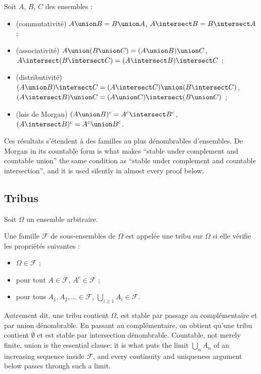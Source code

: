 \begin{notation}
  Soit $A$, $B$, $C$ des ensembles :
  \begin{itemize}
    \item (commutativité) $A \union B = B \union A$,
      $A \intersect B = B \intersect A$ ;
    \item (associativité) $A \union (B \union C) = (A \union B) \union C$,
      $A \intersect (B \intersect C) = (A \intersect B) \intersect C$ ;
    \item (distributivité) $(A \union B) \intersect C = (A \intersect C) \union
      (B \intersect C)$, $(A \intersect B) \union C = (A \union C) \intersect
      (B \union C)$ ;
    \item (lois de Morgan) $(A \union B)^{c} = A^{c} \intersect B^{c}$,
      $(A \intersect B)^{c} = A^{c} \union B^{c}$.
  \end{itemize}
  Ces résultats s'étendent à des familles au plus dénombrables d'ensembles. De
  Morgan in its countable form is what makes ``stable under complement and
  countable union'' the same condition as ``stable under complement and countable
  intersection'', and it is used silently in almost every proof below.
\end{notation}

\subsection{Tribus}

Soit $\Omega$ un ensemble arbitraire.

\begin{definition}[Tribu]
  Une famille $\mathcal{F}$ de sous-ensembles de $\Omega$ est appelée une tribu sur
  $\Omega$ si elle vérifie les propriétés suivantes :
  \begin{itemize}
    \item $\Omega \in \mathcal{F}$ ;
    \item pour tout $A \in \mathcal{F}$, $A^{c} \in \mathcal{F}$ ;
    \item pour tous $A_{1}, A_{2}, \ldots \in \mathcal{F}$,
      $\bigcup_{i \geq 1} A_{i} \in \mathcal{F}$.
  \end{itemize}
\end{definition}

Autrement dit, une tribu contient $\Omega$, est stable par passage au
complémentaire et par union dénombrable. En passant au complémentaire, on obtient
qu'une tribu contient $\emptyset$ et est stable par intersection dénombrable.
Countable, not merely
finite, union is the essential clause: it is what puts the limit $\bigcup_{n} A_{n}$
of an increasing sequence inside $\mathcal{F}$, and every continuity and uniqueness
argument below passes through such a limit.


